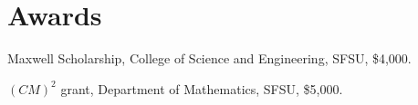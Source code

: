  \section{\sc Awards}
\begin{list1}
  \item[2013-14]  Maxwell Scholarship, College of Science and Engineering, SFSU, \$4,000.
  
  \item[2012-13] $(CM)^2$ grant, Department of Mathematics, SFSU, \$5,000.
\end{list1}